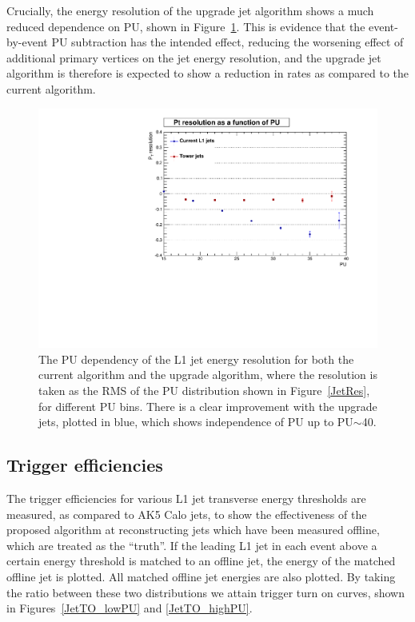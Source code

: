 Crucially, the energy resolution of the upgrade jet algorithm shows a much reduced dependence on \ac{PU}, shown in Figure~\ref{JetResPU}.
This is evidence that the event-by-event \ac{PU} subtraction has the intended effect, 
reducing the worsening effect of additional primary vertices on the jet energy resolution, 
and the upgrade jet algorithm is therefore is expected to show a reduction in rates as compared to the current algorithm.

\begin{figure}[t!]
\begin{center}
  \includegraphics[scale=0.52]{Figures/l1jets/Ptres_vsPU.pdf}
\caption{The \ac{PU} dependency of the \ac{L1} jet energy resolution for both the current algorithm and the upgrade algorithm, where the resolution is taken as the RMS of the PU distribution shown in Figure~\ref{JetRes}, for different \ac{PU} bins. There is a clear improvement with the upgrade jets, plotted in blue, which shows independence of \ac{PU} up to \ac{PU}$\sim$40.}
\label{JetResPU}
\end{center}
\end{figure}

\subsection{Trigger efficiencies}
The trigger efficiencies for various L1 jet transverse energy thresholds are measured, as compared to AK5 Calo jets, to show the effectiveness of the proposed algorithm at reconstructing jets which have been measured offline, which are treated as the ``truth''.
If the leading \ac{L1} jet in each event above a certain energy threshold is matched to an offline jet, the energy of the matched offline jet is plotted. 
All matched offline jet energies are also plotted. 
By taking the ratio between these two distributions we attain trigger turn on curves, shown in Figures~\ref{JetTO_lowPU} and \ref{JetTO_highPU}.

